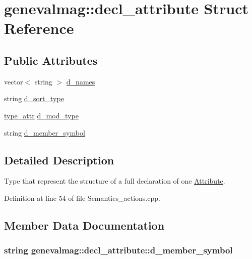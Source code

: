 \hypertarget{structgenevalmag_1_1decl__attribute}{
\section{genevalmag::decl\_\-attribute Struct Reference}
\label{structgenevalmag_1_1decl__attribute}
}
\subsection*{Public Attributes}
\begin{DoxyCompactItemize}
\item 
vector$<$ string $>$ \hyperlink{structgenevalmag_1_1decl__attribute_ac4ea14cc1989803540508a67dc7ff13c}{d\_\-names}
\item 
string \hyperlink{structgenevalmag_1_1decl__attribute_a124f1e6a8dc3316c94e8c3c61cc72254}{d\_\-sort\_\-type}
\item 
\hyperlink{namespacegenevalmag_a0ae71e3da3851df63075a93820da40af}{type\_\-attr} \hyperlink{structgenevalmag_1_1decl__attribute_a2b7f92bae66963a05669e87a7ccb1810}{d\_\-mod\_\-type}
\item 
string \hyperlink{structgenevalmag_1_1decl__attribute_a07dd5a1372cfd1e87525ae96cdd59487}{d\_\-member\_\-symbol}
\end{DoxyCompactItemize}


\subsection{Detailed Description}
Type that represent the structure of a full declaration of one \hyperlink{classgenevalmag_1_1Attribute}{Attribute}. 

Definition at line 54 of file Semantics\_\-actions.cpp.



\subsection{Member Data Documentation}
\hypertarget{structgenevalmag_1_1decl__attribute_a07dd5a1372cfd1e87525ae96cdd59487}{
\subsubsection[{d\_\-member\_\-symbol}]{\setlength{\rightskip}{0pt plus 5cm}string {\bf genevalmag::decl\_\-attribute::d\_\-member\_\-symbol}}}
\label{structgenevalmag_1_1decl__attribute_a07dd5a1372cfd1e87525ae96cdd59487}


